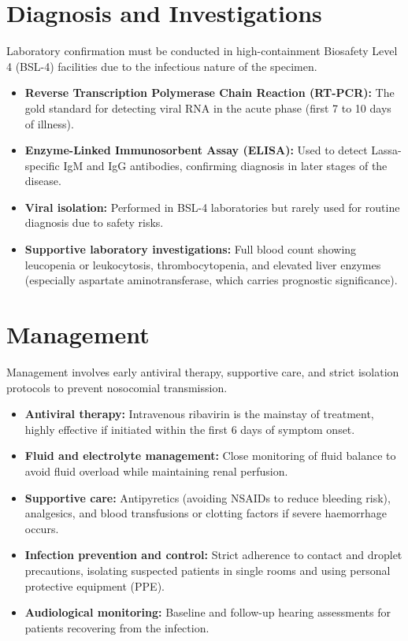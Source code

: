 \section*{Diagnosis and Investigations}
Laboratory confirmation must be conducted in high-containment Biosafety Level 4 (BSL-4) facilities due to the infectious nature of the specimen.
\begin{itemize}
    \item \textbf{Reverse Transcription Polymerase Chain Reaction (RT-PCR):} The gold standard for detecting viral RNA in the acute phase (first 7 to 10 days of illness).
    \item \textbf{Enzyme-Linked Immunosorbent Assay (ELISA):} Used to detect Lassa-specific IgM and IgG antibodies, confirming diagnosis in later stages of the disease.
    \item \textbf{Viral isolation:} Performed in BSL-4 laboratories but rarely used for routine diagnosis due to safety risks.
    \item \textbf{Supportive laboratory investigations:} Full blood count showing leucopenia or leukocytosis, thrombocytopenia, and elevated liver enzymes (especially aspartate aminotransferase, which carries prognostic significance).
\end{itemize}

\section*{Management}
Management involves early antiviral therapy, supportive care, and strict isolation protocols to prevent nosocomial transmission.
\begin{itemize}
    \item \textbf{Antiviral therapy:} Intravenous ribavirin is the mainstay of treatment, highly effective if initiated within the first 6 days of symptom onset.
    \item \textbf{Fluid and electrolyte management:} Close monitoring of fluid balance to avoid fluid overload while maintaining renal perfusion.
    \item \textbf{Supportive care:} Antipyretics (avoiding NSAIDs to reduce bleeding risk), analgesics, and blood transfusions or clotting factors if severe haemorrhage occurs.
    \item \textbf{Infection prevention and control:} Strict adherence to contact and droplet precautions, isolating suspected patients in single rooms and using personal protective equipment (PPE).
    \item \textbf{Audiological monitoring:} Baseline and follow-up hearing assessments for patients recovering from the infection.
\end{itemize}

